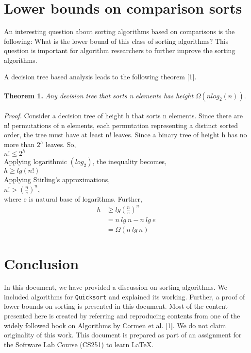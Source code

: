 \documentclass[a4paper, 10pt,twocolumn]{article}
\begin{document}
\section{Lower bounds on comparison sorts}
An interesting question about sorting algorithms
based on comparisons is the following: What is
the lower bound of this class of sorting algorithms?
This question is important for algorithm researchers
to further improve the sorting algorithms.
\par
A decision tree based analysis leads to the following theorem [1]. \\
\\
\textbf{Theorem 1.} \textit{Any decision tree that sorts n elements has height}
$\Omega(nlog_2(n))$.
\\
\\
\textit{Proof.} Consider a decision tree of height h that sorts n elements.
Since there are n! permutations of n elements, each permutation representing
a distinct sorted order, the tree must have at least n! leaves. Since a
binary tree of height h has no more than $2^h$ leaves. So,
\vspace{1mm} \\
\hspace*{0.2cm} $n! \leq 2^h$
\vspace{2mm} \\
Applying logarithmic $(log_2)$, the inequality becomes,
\vspace{1mm} \\
$ h \geq lg(n!) $
\vspace{2mm} \\
Applying Stirling’s approximations,
\vspace{1.5mm} \\
$ n! > {\left(\frac{n}{e}\right)}^n $,
\vspace{1mm} \\
where e is natural base of logarithms. Further,
\begin{align*}
h &\geq lg{\left(\frac{n}{e}\right)}^n \\
 &= n\: lg\: n - n\: lg\: e \\
 &= \Omega(n\: lg\: n)
\end{align*}
\begin{flushright}
\fbox{}
\end{flushright}
\section{Conclusion}
In this document, we have provided a discussion
on sorting algorithms. We included algorithms for
\texttt{Quicksort} and explained its working. Further, a
proof of lower bounds on sorting is presented in this
document. Most of the content presented here is
created by referring and reproducing contents from
one of the widely followed book on Algorithms by
Cormen et al. [1]. We do not claim originality of
this work. This document is prepared as part of an
assignment for the Software Lab Course (CS251) to
learn \LaTeX.
\end{document}
